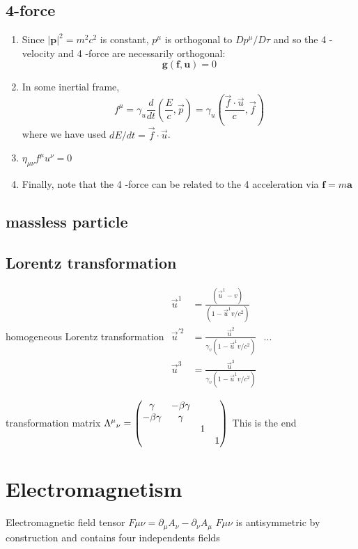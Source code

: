 \documentclass[12pt,a4paper]{article}
\begin{document}
\subsection{4-force}
    \begin{enumerate}
        \item Since $|\boldsymbol{p}|^2=m^2 c^2$ is constant, $p^\mu$ is orthogonal to $D p^\mu / D \tau$ and so the 4 -velocity and 4 -force are necessarily orthogonal:
        $$
        \boldsymbol{g}(\boldsymbol{f}, \boldsymbol{u})=0
        $$
        \item In some inertial frame,
        $$
        f^\mu=\gamma_u \frac{d}{d t}\left(\frac{E}{c}, \vec{p}\right)=\gamma_u\left(\frac{\vec{f} \cdot \vec{u}}{c}, \vec{f}\right)
        $$ where we have used $d E / d t=\vec{f} \cdot \vec{u}$.
        \item $\eta_{\mu \nu} f^\mu u^\nu=0$
        \item Finally, note that the 4 -force can be related to the 4 acceleration via $\boldsymbol{f}=m \boldsymbol{a}$
    \end{enumerate}
\subsection{massless particle}
\subsection{Lorentz transformation}
\begin{definition}
    {homogeneous Lorentz transformation}
    {$\begin{aligned} \vec{u}^1 & =\frac{\left(\vec{u}^1-v\right)}{\left(1-\vec{u}^1 v / c^2\right)} \\ \vec{u}^{\prime 2} & =\frac{\vec{u}^2}{\gamma_v\left(1-\vec{u}^1 v / c^2\right)} \\ \vec{u}^3 & =\frac{\vec{u}^3}{\gamma_v\left(1-\vec{u}^1 v / c^2\right)}\end{aligned}$}
    {...}
\end{definition}
\begin{definition}
    {transformation matrix}
    {${\Lambda^\mu}_\nu = \mqty(\dmat{\gamma & -\beta\gamma \\ -\beta\gamma & \gamma,1,1})$}
    {This is the end }
\end{definition}


\section{Electromagnetism}
\begin{definition}
    {Electromagnetic field tensor}
    {$F\mu\nu = \partial_\mu A_\nu - \partial_\nu A_\mu$}
    {$F\mu\nu$ is antisymmetric by construction and contains four independents fields }
\end{definition}
\end{document}
